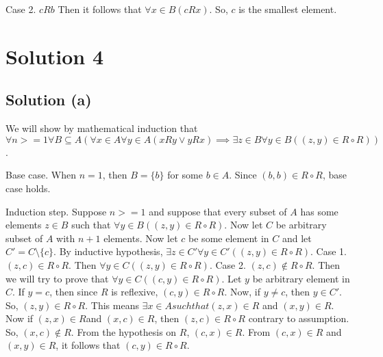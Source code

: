 \documentclass{article}
\begin{document}
Case 2. $cRb$ Then it follows that $\forall x \in B(cRx)$. So, $c$ is
the smallest element.

\section{Solution 4}
\subsection{Solution (a)}
We will show by mathematical induction that $\forall n >= 1 \forall B
\subseteq A (\forall x \in A \forall y \in A(xRy \lor yRx) \implies
\exists z \in B \forall y \in B((z,y) \in R \circ R))$.

Base case. When $n=1$, then $B = \{b\}$ for some $b \in A$. Since
$(b,b) \in R \circ R$, base case holds.

Induction step. Suppose $n >= 1$ and suppose that every subset of $A$
has some elements $z \in B$ such that $\forall y \in B((z,y) \in R
\circ R)$. Now let $C$ be arbitrary subset of $A$ with $n+1$ elements.
Now let $c$ be some element in $C$ and let $C' = C \setminus \{c\}$.
By inductive hypothesis, $\exists z \in C' \forall y \in C'((z,y) \in
R \circ R)$.
Case 1. $(z,c) \in R \circ R$. Then $\forall y \in C((z,y) \in R \circ
R)$.
Case 2. $(z,c) \notin R \circ R$. Then we will try to prove that
$\forall y \in C((c,y) \in R \circ R)$. Let $y$ be arbitrary element
in $C$. If $y = c$, then since $R$ is reflexive, $(c,y) \in R \circ
R$. Now, if $y \neq c$, then $y \in C'$. So, $(z,y) \in R \circ R$.
This means $\exists x \in A such that (z,x) \in R$ and $(x,y) \in R$.
Now if $(z,x) \in R$and $(x,c) \in R$, then $(z,c) \in R \circ R$
contrary to assumption. So, $(x,c) \notin R$. From the hypothesis on
$R$, $(c,x) \in R$. From $(c,x) \in R$ and $(x,y) \in R$, it follows
that $(c,y) \in R \circ R$.
\end{document}
